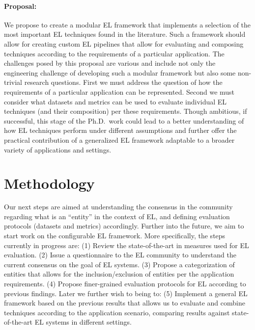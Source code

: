 \documentclass[sigconf]{acmart}
\begin{document}
\paragraph{Proposal:} We propose to create a modular EL framework that implements a selection of the most important EL techniques found in the literature. Such a framework should allow for creating custom EL pipelines that allow for evaluating and composing techniques according to the requirements of a particular application. The challenges posed by this proposal are various and include not only the engineering challenge of developing such a modular framework but also some non-trivial research questions. First we must address the question of how the requirements of a particular application can be represented. Second we must consider what datasets and metrics can be used to evaluate individual EL techniques (and their composition) per these requirements. Though ambitious, if successful, this stage of the Ph.D.\ work could lead to a better understanding of how EL techniques perform under different assumptions and further offer the practical contribution of a generalized EL framework adaptable to a broader variety of applications and settings.

\section{Methodology}

Our next steps are aimed at understanding the consensus in the community regarding what is an ``entity'' in the context of EL, and defining evaluation protocols (datasets and metrics) accordingly. Further into the future, we aim to start work on the configurable EL framework. More specifically, the steps currently in progress are: (1) Review the state-of-the-art in measures used for EL evaluation. (2) Issue a questionnaire to the EL community to understand the current consensus on the goal of EL systems. (3) Propose a categorization of entities that allows for the inclusion/exclusion of entities per the application requirements. (4) Propose finer-grained evaluation protocols for EL according to previous findings. Later we further wish to being to: (5) Implement a general EL framework based on the previous results that allows us to evaluate and combine techniques according to the application scenario, comparing results against state-of-the-art EL systems in different settings.


\end{document}

